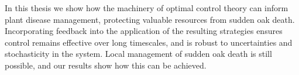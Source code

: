 In this thesis we show how the machinery of optimal control theory can inform plant disease management, protecting valuable resources from sudden oak death. Incorporating feedback into the application of the resulting strategies ensures control remains effective over long timescales, and is robust to uncertainties and stochasticity in the system. Local management of sudden oak death is still possible, and our results show how this can be achieved.